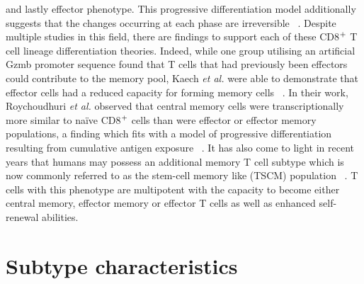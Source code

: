 and lastly effector phenotype. This progressive differentiation model additionally suggests that the changes occurring at each phase are irreversible ~\autocite{Roy2015}. Despite multiple studies in this field, there are findings to support each of these CD8$\textsuperscript{+}$ T cell lineage differentiation theories. Indeed, while one group utilising an artificial Gzmb promoter sequence found that T cells that had previously been effectors could contribute to the memory pool, Kaech \textit{et al.} were able to demonstrate that effector cells had a reduced capacity for forming memory cells ~\autocite{Kae2003,Roy2015}. In their work, Roychoudhuri \textit{et al.} observed that central memory cells were transcriptionally more similar to na\"ive CD8$\textsuperscript{+}$ cells than were effector or effector memory populations, a finding which fits with a model of progressive differentiation resulting from cumulative antigen exposure ~\autocite{Roy2015}. It has also come to light in recent years that humans may possess an additional memory T cell subtype which is now commonly referred to as the stem-cell memory like (TSCM) population ~\autocite{Edw2014}. T cells with this phenotype are multipotent with the capacity to become either central memory, effector memory or effector T cells as well as enhanced self-renewal abilities.

\section{Subtype characteristics}

